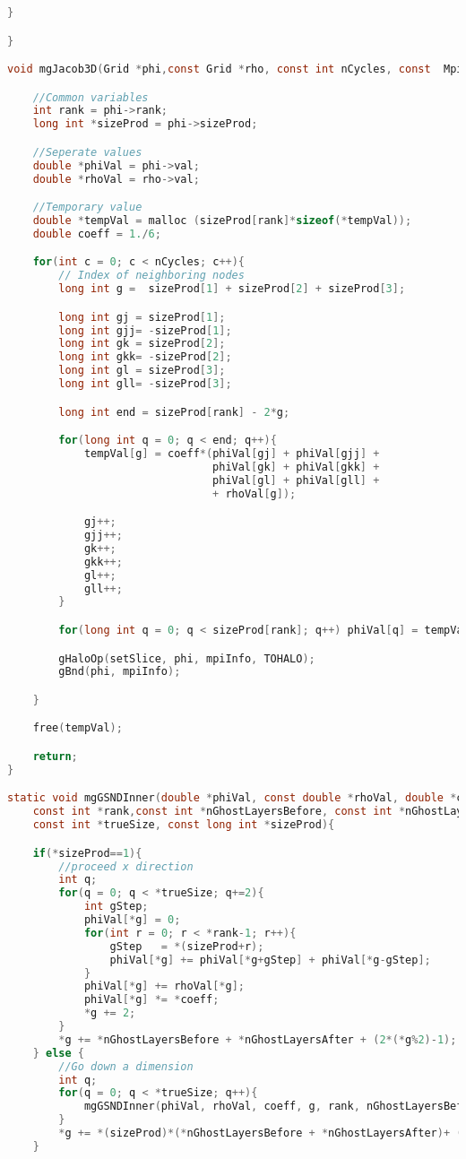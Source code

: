 \begin{lstlisting}[language=c, caption = main routine]
	}

}

void mgJacob3D(Grid *phi,const Grid *rho, const int nCycles, const  MpiInfo *mpiInfo){

	//Common variables
	int rank = phi->rank;
	long int *sizeProd = phi->sizeProd;

	//Seperate values
	double *phiVal = phi->val;
	double *rhoVal = rho->val;

	//Temporary value
	double *tempVal = malloc (sizeProd[rank]*sizeof(*tempVal));
	double coeff = 1./6;

	for(int c = 0; c < nCycles; c++){
		// Index of neighboring nodes
		long int g =  sizeProd[1] + sizeProd[2] + sizeProd[3];

		long int gj = sizeProd[1];
		long int gjj= -sizeProd[1];
		long int gk = sizeProd[2];
		long int gkk= -sizeProd[2];
		long int gl = sizeProd[3];
		long int gll= -sizeProd[3];

		long int end = sizeProd[rank] - 2*g;

		for(long int q = 0; q < end; q++){
			tempVal[g] = coeff*(phiVal[gj] + phiVal[gjj] +
								phiVal[gk] + phiVal[gkk] +
								phiVal[gl] + phiVal[gll] +
								+ rhoVal[g]);

			gj++;
			gjj++;
			gk++;
			gkk++;
			gl++;
			gll++;
		}

		for(long int q = 0; q < sizeProd[rank]; q++) phiVal[q] = tempVal[q];

		gHaloOp(setSlice, phi, mpiInfo, TOHALO);
		gBnd(phi, mpiInfo);

	}

	free(tempVal);

	return;
}

static void mgGSNDInner(double *phiVal, const double *rhoVal, double *coeff, long int *g,
	const int *rank,const int *nGhostLayersBefore, const int *nGhostLayersAfter,
	const int *trueSize, const long int *sizeProd){

	if(*sizeProd==1){
		//proceed x direction
		int q;
		for(q = 0; q < *trueSize; q+=2){
			int gStep;
			phiVal[*g] = 0;
			for(int r = 0; r < *rank-1; r++){
				gStep 	= *(sizeProd+r);
				phiVal[*g] += phiVal[*g+gStep] + phiVal[*g-gStep];
			}
			phiVal[*g] += rhoVal[*g];
			phiVal[*g] *= *coeff;
			*g += 2;
		}
		*g += *nGhostLayersBefore + *nGhostLayersAfter + (2*(*g%2)-1);
	} else {
		//Go down a dimension
		int q;
		for(q = 0; q < *trueSize; q++){
			mgGSNDInner(phiVal, rhoVal, coeff, g, rank, nGhostLayersBefore-1, nGhostLayersAfter-1, trueSize-1, sizeProd-1);
		}
		*g += *(sizeProd)*(*nGhostLayersBefore + *nGhostLayersAfter)+ (2*(*g%2)-1);
	}


\end{lstlisting}
